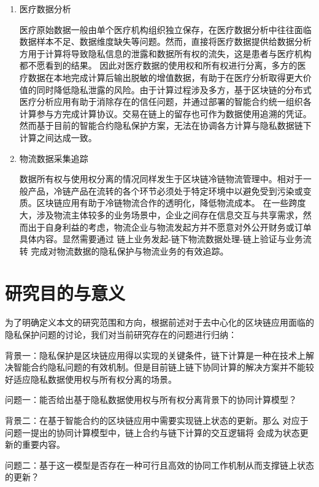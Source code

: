 \begin{enumerate}

\item 医疗数据分析

医疗原始数据一般由单个医疗机构组织独立保存，在医疗数据分析中往往面临数据样本不足、数据维度缺失等问题。然而，直接将医疗数据提供给数据分析方用于计算将导致隐私信息的泄露和数据所有权的流失，这是患者与医疗机构都不愿看到的结果。
因此对医疗数据的使用权和所有权进行分离，多方的医疗数据在本地完成计算后输出脱敏的增值数据，有助于在医疗分析取得更大价值的同时降低隐私泄露的风险。由于计算过程涉及多方，基于区块链的分布式医疗分析应用有助于消除存在的信任问题，并通过部署的智能合约统一组织各计算参与方完成计算协议。交易在链上的留存也可作为数据使用追溯的凭证。然而基于目前的智能合约隐私保护方案，无法在协调各方计算与隐私数据链下计算之间达成一致。
    
\item 物流数据采集追踪

数据所有权与使用权分离的情况同样发生于区块链冷链物流管理中。相对于一般产品，冷链产品在流转的各个环节必须处于特定环境中以避免受到污染或变质。区块链应用有助于冷链物流合作的透明化，降低物流成本。
在一些跨度大，涉及物流主体较多的业务场景中，企业之间存在信息交互与共享需求，然而出于自身利益的考虑，物流企业与物流发起方并不愿意对外公开财务或订单具体内容。显然需要通过 链上业务发起-链下物流数据处理-链上验证与业务流转 完成对物流数据的隐私保护与物流业务的有效追踪。

\end{enumerate}

\section{研究目的与意义}

为了明确定义本文的研究范围和方向，根据前述对于去中心化的区块链应用面临的隐私保护问题的讨论，我们对当前研究存在的问题进行归纳：

背景一：隐私保护是区块链应用得以实现的关键条件，链下计算是一种在技术上解决智能合约隐私问题的有效机制。但是目前链上链下协同计算的解决方案并不能较好适应隐私数据使用权与所有权分离的场景。

问题一：能否给出基于隐私数据使用权与所有权分离背景下的协同计算模型？

背景二：在基于智能合约的区块链应用中需要实现链上状态的更新。那么
对应于问题一提出的协同计算模型中，链上合约与链下计算的交互逻辑将
会成为状态更新的重要内容。

问题二：基于这一模型是否存在一种可行且高效的协同工作机制从而支撑链上状态的更新？

